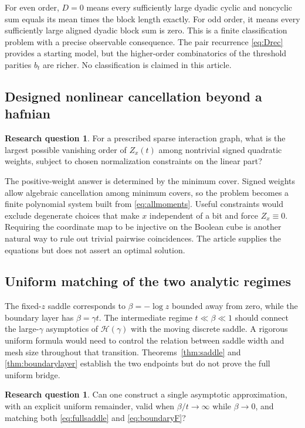 \documentclass[11pt,oneside]{article}
\numberwithin{equation}{section}
\theoremstyle{definition}
\newtheorem{question}[theorem]{Research question}
\theoremstyle{remark}
\begin{document}
For even order, \(D=0\) means every sufficiently large dyadic cyclic and
noncyclic sum equals its mean times the block length exactly. For odd order,
it means every sufficiently large aligned dyadic block sum is zero. This is
a finite classification problem with a precise observable consequence.
The pair recurrence \eqref{eq:Drec} provides a starting model, but the
higher-order combinatorics of the threshold parities \(b_t\) are richer.
No classification is claimed in this article.

\subsection{Designed nonlinear cancellation beyond a hafnian}
\begin{question}
For a prescribed sparse interaction graph, what is the largest possible
vanishing order of \(Z_x(t)\) among nontrivial signed quadratic weights,
subject to chosen normalization constraints on the linear part?
\end{question}

The positive-weight answer is determined by the minimum cover. Signed weights
allow algebraic cancellation among minimum covers, so the problem becomes a
finite polynomial system built from \eqref{eq:allmoments}. Useful constraints
would exclude degenerate choices that make \(x\) independent of a bit and
force \(Z_x\equiv0\). Requiring the coordinate map to be injective on the
Boolean cube is another natural way to rule out trivial pairwise coincidences.
The article supplies the equations but does not assert an optimal solution.

\subsection{Uniform matching of the two analytic regimes}
The fixed-\(z\) saddle corresponds to \(\beta=-\log z\) bounded away from zero,
while the boundary layer has \(\beta=\gamma t\). The intermediate regime
\(t\ll\beta\ll1\) should connect the large-\(\gamma\) asymptotics of
\(\mathcal H(\gamma)\) with the moving discrete saddle. A rigorous uniform
formula would need to control the relation between saddle width and mesh
size throughout that transition. Theorems~\ref{thm:saddle} and
\ref{thm:boundarylayer} establish the two endpoints but do not prove the full
uniform bridge.

\begin{question}
Can one construct a single asymptotic approximation, with an explicit
uniform remainder, valid when \(\beta/t\to\infty\) while \(\beta\to0\),
and matching both \eqref{eq:fullsaddle} and \eqref{eq:boundaryF}?
\end{question}
\end{document}
